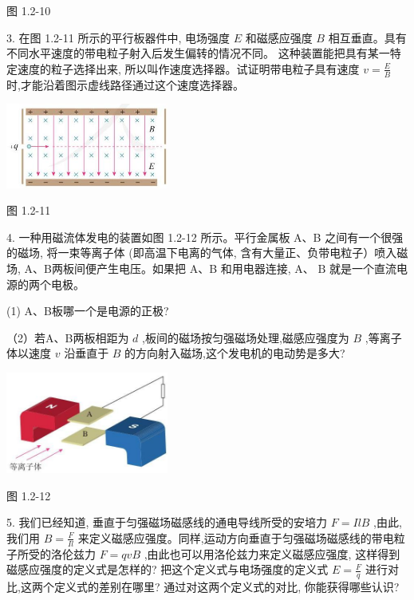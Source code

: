 \documentclass[10pt]{article}
\begin{document}
图 1.2-10

3. 在图 1.2-11 所示的平行板器件中, 电场强度 \(E\) 和磁感应强度 \(B\) 相互垂直。具有不同水平速度的带电粒子射入后发生偏转的情况不同。 这种装置能把具有某一特定速度的粒子选择出来, 所以叫作速度选择器。试证明带电粒子具有速度 \(v = \frac{E}{B}\) 时,才能沿着图示虚线路径通过这个速度选择器。

\begin{center}
\includegraphics[max width=0.4\textwidth]{images/01910e72-c5b7-7ed5-a6d4-fb3a5faefc32_17_945085.jpg}
\end{center}

图 1.2-11

4. 一种用磁流体发电的装置如图 1.2-12 所示。平行金属板 A、B 之间有一个很强的磁场, 将一束等离子体 (即高温下电离的气体, 含有大量正、负带电粒子）喷入磁场, A、B两板间便产生电压。如果把 A、B 和用电器连接, A、 \(\mathrm{B}\) 就是一个直流电源的两个电极。

(1) A、B板哪一个是电源的正极?

（2）若A、B两板相距为 \(d\) ,板间的磁场按匀强磁场处理,磁感应强度为 \(B\) ,等离子体以速度 \(v\) 沿垂直于 \(B\) 的方向射入磁场,这个发电机的电动势是多大?

\begin{center}
\includegraphics[max width=0.4\textwidth]{images/01910e72-c5b7-7ed5-a6d4-fb3a5faefc32_17_644790.jpg}
\end{center}

图 1.2-12

5. 我们已经知道, 垂直于匀强磁场磁感线的通电导线所受的安培力 \(F = {IlB}\) ,由此,我们用 \(B = \frac{F}{Il}\) 来定义磁感应强度。同样,运动方向垂直于匀强磁场磁感线的带电粒子所受的洛伦兹力 \(F = {qvB}\) ,由此也可以用洛伦兹力来定义磁感应强度, 这样得到磁感应强度的定义式是怎样的? 把这个定义式与电场强度的定义式 \(E = \frac{F}{q}\) 进行对比,这两个定义式的差别在哪里? 通过对这两个定义式的对比, 你能获得哪些认识?
\end{document}
